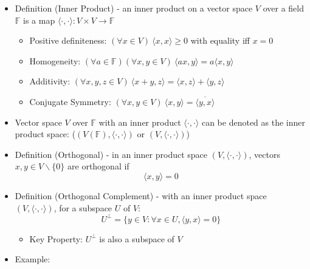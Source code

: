 \documentclass{article}
\begin{document}
\begin{itemize}
\begin{itemize}
\begin{itemize}
\begin{itemize}
            \end{itemize}
            \item $ker(L) = \{ A_{-}e^{k(-x)} + A_{+} e^{k(+x)} : A_{-}, A_{+} \in \mathbb{C} \}$
        \end{itemize}
    \end{itemize}
    \item Definition (Inner Product) - an inner product on a vector space $V$ over a field $\mathbb{F}$ is a map $\langle \cdot, \cdot \rangle : V \times V \rightarrow \mathbb{F}$
    \begin{itemize}
        \item Positive definiteness: $(\forall x \in V) \ \langle x, x \rangle \ge 0$ with equality iff $x = 0$
        \item Homogeneity: $(\forall a \in \mathbb{F})(\forall x,y \in V) \ \langle ax, y \rangle = a \langle x,y \rangle$
        \item Additivity: $(\forall x,y,z \in V) \ \langle x+y,z \rangle = \langle x,z \rangle + \langle y,z \rangle$
        \item Conjugate Symmetry: $(\forall x,y \in V) \ \langle x,y \rangle = \overline{\langle y,x \rangle}$
    \end{itemize}
    \item Vector space $V$ over $\mathbb{F}$ with an inner product $\langle \cdot,\cdot \rangle$ can be denoted as the inner product space: ($(V(\mathbb{F}), \langle \cdot,\cdot \rangle)$ or $(V,\langle \cdot,\cdot \rangle)$)
    \item Definition (Orthogonal) - in an inner product space $(V,\langle \cdot,\cdot \rangle)$, vectors $x,y \in V \backslash \{0\}$ are orthogonal if
    \[
    \langle x,y \rangle = 0
    \]
    \item Definition (Orthogonal Complement) - with an inner product space $(V, \langle \cdot,\cdot \rangle)$, for a subspace $U$ of $V$:
    \[
    U^{\perp} = \{ y \in V : \forall x \in U, \langle y,x \rangle = 0 \}
    \]
    \begin{itemize}
        \item Key Property: $U^{\perp}$ is also a subspace of $V$
    \end{itemize}
    \item Example:
    \begin{itemize}
        \item $V = \mathbb{R}^2, \mathbb{F} = \mathbb{R}, \quad X = \{ \left[ \begin{array}{cc}
            x \\ y

\end{array}
\end{itemize}
\end{itemize}
\end{document}
